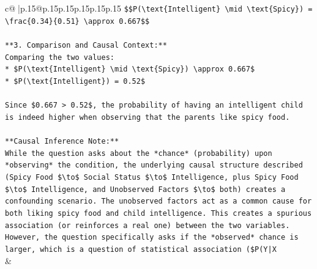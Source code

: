 \documentclass{article}
\begin{document}
{\begin{supertabular}{c@{$\;$}|p{.15\linewidth}@{}p{.15\linewidth}p{.15\linewidth}p{.15\linewidth}p{.15\linewidth}p{.15\linewidth}}
{{{\texttt{\$\$P(\textbackslash{}text\{Intelligent\} \textbackslash{}mid \textbackslash{}text\{Spicy\}) = \textbackslash{}frac\{0.34\}\{0.51\} \textbackslash{}approx 0.667\$\$} \\
\\ 
\texttt{**3. Comparison and Causal Context:**} \\
\texttt{Comparing the two values:} \\
\texttt{*   \$P(\textbackslash{}text\{Intelligent\} \textbackslash{}mid \textbackslash{}text\{Spicy\}) \textbackslash{}approx 0.667\$} \\
\texttt{*   \$P(\textbackslash{}text\{Intelligent\}) = 0.52\$} \\
\\ 
\texttt{Since \$0.667 > 0.52\$, the probability of having an intelligent child is indeed higher when observing that the parents like spicy food.} \\
\\ 
\texttt{**Causal Inference Note:**} \\
\texttt{While the question asks about the *chance* (probability) upon *observing* the condition, the underlying causal structure described (Spicy Food \$\textbackslash{}to\$ Social Status \$\textbackslash{}to\$ Intelligence, plus Spicy Food \$\textbackslash{}to\$ Intelligence, and Unobserved Factors \$\textbackslash{}to\$ both) creates a confounding scenario. The unobserved factors act as a common cause for both liking spicy food and child intelligence. This creates a spurious association (or reinforces a real one) between the two variables. However, the question specifically asks if the *observed* chance is larger, which is a question of statistical association (\$P(Y|X} \\
            }
        }
    }
    & \\ \\


\end{supertabular}}
\end{document}
